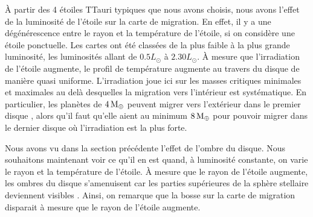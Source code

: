 À partir des 4 étoiles TTauri typiques que nous avons choisis, nous avons l'effet de la luminosité de l'étoile sur la carte de migration. En effet, il y a une dégénérescence entre le rayon et la température de l'étoile, si on considère une étoile ponctuelle. Les cartes ont été classées de la plus faible à la plus grande luminosité, les luminosités allant de $0.5\unit{L_\odot}$ à $2.30\unit{L_\odot}$. À mesure que l'irradiation de l'étoile augmente, le profil de température augmente au travers du disque de manière quasi uniforme. L'irradiation joue ici sur les masses critiques minimales et maximales au delà desquelles la migration vers l'intérieur est systématique. En particulier, les planètes de $4\mathrm{\thinspace M_\oplus}$ peuvent migrer vers l'extérieur dans le premier disque , alors qu'il faut qu'elle aient au minimum $8\mathrm{\thinspace M_\oplus}$ pour pouvoir migrer dans le dernier disque  où l'irradiation est la plus forte. 

\bigskip

Nous avons vu dans la section précédente l'effet de l'ombre du disque. Nous souhaitons maintenant voir ce qu'il en est quand, à luminosité constante, on varie le rayon et la température de l'étoile. À mesure que le rayon de l'étoile augmente, les ombres du disque s'amenuisent car les parties supérieures de la sphère stellaire deviennent visibles . Ainsi, on remarque que la bosse sur la carte de migration disparait à mesure que le rayon de l'étoile augmente. 

